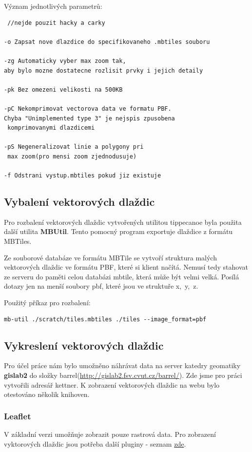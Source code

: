 \documentclass[12pt]{article}
\begin{document}
\vspace{0.5cm}
Význam jednotlivých parametrů:
\begin{lstlisting} //nejde pouzit hacky a carky

-o Zapsat nove dlazdice do specifikovaneho .mbtiles souboru

-zg Automaticky vyber max zoom tak,
aby bylo mozne dostatecne rozlisit prvky i jejich detaily

-pk Bez omezeni velikosti na 500KB

-pC Nekomprimovat vectorova data ve formatu PBF.
Chyba "Unimplemented type 3" je nejspis zpusobena
 komprimovanymi dlazdicemi

-pS Negeneralizovat linie a polygony pri
 max zoom(pro mensi zoom zjednodusuje)

-f Odstrani vystup.mbtiles pokud jiz existuje
\end{lstlisting}


\subsection{Vybalení vektorových dlaždic}
Pro rozbalení vektorových dlaždic vytvořených utilitou tippecanoe byla použita další utilita \textbf{MBUtil}. Tento pomocný program exportuje dlaždice z formátu \mbox{MBTiles}. 

Ze souborové databáze ve formátu MBTile se vytvoří struktura malých vektorových dlaždic ve formátu PBF, které si klient načítá. Nemusí tedy stahovat ze serveru do paměti celou databázi mbtile, která může být velmi velká. Posílá dotazy jen na menší soubory pbf, které jsou ve struktuře \mbox{x, y, z}.

\vspace{0.5cm}
Použitý příkaz pro rozbalení:

\begin{lstlisting}
mb-util ./scratch/tiles.mbtiles ./tiles --image_format=pbf
\end{lstlisting}

\subsection{Vykreslení vektorových dlaždic}
Pro účel práce nám bylo umožněno náhrávat data na server katedry geomatiky \textbf{gislab2} do složky barrel(\url{http://gislab2.fsv.cvut.cz/barrel/}). Zde jsme pro práci vytvořili adresář kettner. K zobrazení vektorových dlaždic na webu bylo otestováno několik knihoven.

\subsubsection{Leaflet}
V základní verzi umožňuje zobrazit pouze rastrová data. Pro zobrazení vyktorových dlaždic jsou potřeba další pluginy - seznam \href{https://leafletjs.com/plugins.html#vector-tiles}{zde}.
\end{document}
